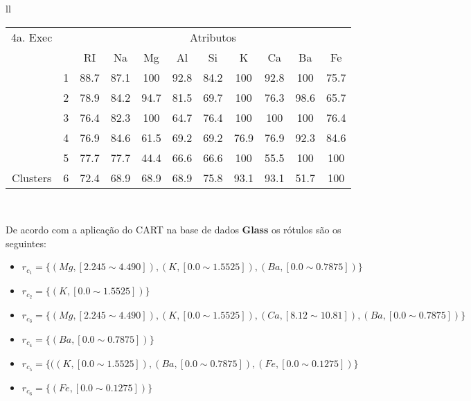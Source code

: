 \begin{table}[!ht]
\begin{tabular}{ll}
       \small\addtolength{\tabcolsep}{-5pt}
    \begin{tabular}{|cl|c|c|c|c|c|c|c|c|c|}
        \hline \hline
            {\tiny 4a. Exec}     &   & \multicolumn{9}{c|}{\tiny Atributos}                                               \\ \cline{3-11} 
       \multicolumn{1}{|l}{}                            &   & RI    & Na    & Mg  & Al   & Si   & K   & Ca   & Ba  & Fe             \\ \hline
        \multicolumn{1}{|c|}{}                           & 1 & 88.7 & 87.1  & 100 & 92.8 & 84.2 & 100 & 92.8 & 100 & 75.7 \\ \cline{2-11} 
        \multicolumn{1}{|c|}{}                           & 2 & 78.9 & 84.2  & 94.7 & 81.5 & 69.7 & 100  & 76.3 &98.6 & 65.7  \\ \cline{2-11} 
        \multicolumn{1}{|c|}{}                           & 3 & 76.4   & 82.3& 100  & 64.7 & 76.4 & 100  & 100 & 100 & 76.4  \\ \cline{2-11}
        \multicolumn{1}{|c|}{}                           & 4 & 76.9   & 84.6& 61.5  & 69.2 & 69.2 & 76.9  & 76.9 & 92.3 & 84.6  \\ \cline{2-11}
        \multicolumn{1}{|c|}{}                           & 5 & 77.7   & 77.7& 44.4  & 66.6 & 66.6 & 100  & 55.5 & 100 & 100  \\ \cline{2-11}
        \multicolumn{1}{|c|}{\multirow{-3}{*}{\tiny Clusters}} & 6 & 72.4 & 68.9& 68.9  & 68.9 & 75.8 & 93.1  & 93.1 & 51.7 & 100  \\ 
        
        \hline
      \end{tabular}
   \\
 
 \end{tabular}
 \label{tab:execucoes:glass:cart}
\end{table}


De acordo com a aplicação do CART na base de dados \textbf{Glass} os rótulos são os seguintes:
\begin{itemize}[noitemsep]
 \item ${r_{c_1}=\{ (Mg, [ 2.245 \sim 4.490 ]), (K,[ 0.0 \sim 1.5525 ] ), (Ba,[ 0.0 \sim 0.7875 ] ) \} }$  
 \item ${r_{c_2}=\{ (K,[ 0.0 \sim 1.5525 ] ) \} }$
 \item ${r_{c_3}=\{ (Mg, [ 2.245 \sim 4.490 ]), (K,[ 0.0 \sim 1.5525 ] ), (Ca,[ 8.12 \sim 10.81 ] ), (Ba,[ 0.0 \sim 0.7875 ] ) \} }$  
 \item ${r_{c_4}=\{ (Ba,[ 0.0 \sim 0.7875 ] ) \} }$
 \item ${r_{c_5}=\{ ( (K,[ 0.0 \sim 1.5525 ] ), (Ba,[ 0.0 \sim 0.7875 ] ), (Fe,[ 0.0 \sim 0.1275 ] ) \} }$
 \item ${r_{c_6}=\{ (Fe,[ 0.0 \sim 0.1275 ] ) \} }$
\end{itemize}



